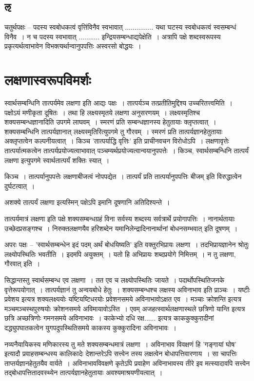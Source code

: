 		\subsection{ऌ}
		
			चतुर्थपक्षः – पदस्य स्वबोधकत्वं वृत्तिंविनैव स्वभावात् ............... यथा घटस्य स्वबोधकत्वं स्वसम्बन्धं विनैव~। न च पदस्य स्वभावात् ........... इन्द्रियसम्बन्धाद्यपेक्षेति~। अत्रापि पक्षे शब्दस्वरूपस्य प्रकृत्यर्थत्वाभावेन विभक्त्यर्थान्वानुपपत्तिः अस्वरसो बोद्धयः~।

	\section{लक्षणास्वरूपविमर्शः}

		स्वार्थसम्बन्धिनि तात्पर्यमेव लक्षणा इति आद्यः पक्षः~। तात्पर्यञ्च तत्प्रतीतिमुद्दिश्य उच्चरितत्त्वमिति~। पक्षोऽयं मणीकृता दूषितः~। तथा हि लक्ष्यस्मृतये लक्षणा अनुसरणयम्~। लक्ष्यस्मृतिश्च शक्यसम्बन्धज्ञानादिति उपगमे लाघवम्~। स्मरणं प्रति सम्बन्धज्ञानस्य हेतुतायाः क्लृप्तत्वात्~। शक्यसम्बन्धिनि तात्पर्यज्ञानात् लक्ष्यस्मृतिरित्युपगमे तु गौरवम्~। स्मरणं प्रति तात्पर्यज्ञानहेतुतायाः अक्लृप्तत्वेन कल्पनीयत्वात्~। किञ्च ’तात्पर्याद्धि वृत्तिः’ इति प्राचीनवचन विरोधोऽपि~। लक्षणावृत्तेः तात्पर्यात्मकत्वेन तात्पर्यप्रयोज्यत्वाभावात् पञ्चम्यर्थप्रयोज्यत्वान्वयानुपपत्तेः~। किञ्च, स्वार्थसम्बन्धिनि तात्पर्यं लक्षणा इत्युपगमे स्वार्थतात्पर्यं शक्तिः स्यात्~।
	
		किञ्च~। तात्पर्यानुपपत्तेः लक्षणाबीजत्वं नोपपद्येत~। तात्पर्यं प्रति तात्पर्यानुपपत्तिः बीजम् इति विरुद्धात्वेन दुर्घटत्वात्~।
	
		अशक्ये तात्पर्यं लक्षणा इत्यस्मिन् पक्षेऽपि इमानि दूषणानि अतिदिश्यन्ते~।
	
		तात्पर्यमात्रं लक्षणा इति पक्षे शक्यसम्बन्धग्रहं  विना सर्वस्य शब्दस्य सर्वत्रार्थे प्रयोगापत्तिः~। नानार्थतायाः उच्छेदप्रसङ्गश्च~। निरुक्तलक्षणयैव हरिशब्देन यमानिलेन्द्रादिनानार्थानां बोधनसम्भवात् इति दूषणम्~।
	
		अपरः पक्षः – ’स्वार्थसम्बन्धेन इदं पदम् अर्थं बोधयिष्यति’ इति वक्तुरभिप्रायः लक्षणा~। तदभिप्रायज्ञानेन श्रोतुः लक्ष्योपस्थितिः भवतीति~। इदमपि अयुक्तम्~। यतो हि अभिप्रायः शब्दप्रयोगे निमित्तम्~। न तु लक्षणा, गौरवात् इति~।
	
		सिद्धान्तस्तु  स्वार्थसम्बन्ध एव लक्षणा~। तत एव च लक्ष्योपस्थितिः जायते~। पदार्थोपस्थितिजनके वृत्तेरूपयोगात्~। तात्पर्यज्ञानं तु अन्वयबोधे हेतुः~। शक्यसम्बन्धश्च लक्षस्य अविनाभाव इति प्राञ्चः~। यष्टीः प्रवेशय इत्यत्र शक्यलक्ष्ययोः यष्टियष्टिधरयोः प्रवेशनसमये अविनाभावोऽक्षत एव~। मञ्चाः क्रोशन्ति इत्यत्र मञ्चमञ्चस्थपुरुषयोः क्रोशनसमये अविमायावोऽस्ति~। एवम् अजहत्स्वार्थलक्षणास्थले छत्रिणो यान्ति इत्यत्र छत्रि अच्छत्रिणोः गमनसमये अविनाभावः~। काकेभ्यो दधि रक्ष...... इत्यत्र काककुक्कुरादीनां दद्ध्युपघातकत्वेन युगपदुपस्थितिसमये काकस्य कुक्कुरादिना अविनाभावः~।
	
		नव्यनैयायिकस्य मणिकारस्य तु मते शक्यसम्बन्धमात्रं लक्षणा~। अविनाभाव विवक्षणं हि ’गङ्गायां घोष’ इत्यादौ प्रवाहसम्बन्धस्य कालिकादेः देशान्तरेऽपि सत्त्वेन तस्य लक्षत्वेन बोधापत्तिवारणाय~। सा चापत्तिः ताप्तर्यज्ञानहेतुतयैव वार्यते~। अविनाभावविवक्षणे कृतेऽपि प्रवाहेण अविनाभावस्य तीरे इव मत्स्यादावपि सत्त्वेन तद्बोधापत्तितादवस्थ्येन तात्पर्यज्ञानहेतुतायाः अवश्यमाश्रयणीयत्वात्~।


